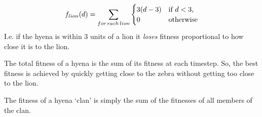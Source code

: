 \documentclass{article}
\begin{document}
\begin{equation}
f_{lion}(d) = \sum_{for\, each\, lion}{
\begin{cases} 3(d-3) & \text{if $d<3$,}\\
$0$ &\text{otherwise}
\end{cases}
}
\end{equation}
I.e. if the hyena is within 3 units of a lion it \textit{loses} fitness proportional to how close it is to the lion.  

The total fitness of a hyena is the sum of its fitness at each timestep.  So, the best fitness is achieved by quickly getting close to the zebra without getting too close to the lion.

The fitness of a hyena `clan' is simply the sum of the fitnesses of all members of the clan.  
\end{document}
